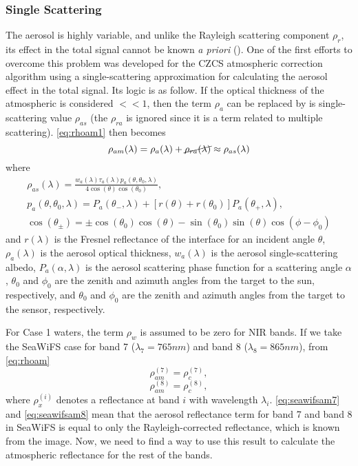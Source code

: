 \subsubsection{Single Scattering}
The aerosol is highly variable, and unlike the Rayleigh scattering component $\rho_r$, its effect in the total signal cannot be known {\it a priori} (\cite{Gordon:1994}). One of the first efforts to overcome this problem was developed for the CZCS atmospheric correction algorithm using a single-scattering approximation for calculating the aerosol effect in the total signal. Its logic is as follow. If the optical thickness of the atmospheric is considered $<<1$, then the term $\rho_a$ can be replaced by is single-scattering value $\rho_{as}$ (the $\rho_{ra}$ is ignored since it is a term related to multiple scattering). \autoref{eq:rhoam1} then becomes
\begin{equation}\label{eq:singleapprox}
  \rho_{am}(\lambda) = \rho_a(\lambda)+\cancel{\rho_{ra}(\lambda)} \approx \rho_{as}(\lambda)
\end{equation}
where
\begin{equation}
  \begin{gathered}
    \rho_{as}(\lambda) = \frac{w_a(\lambda)\tau_a(\lambda)p_a(\theta,\theta_0,\lambda)}{4\cos(\theta)\cos(\theta_0)},\\  
    p_a(\theta,\theta_0,\lambda) = P_a(\theta_{-},\lambda) + [r(\theta)+r(\theta_0)]P_a(\theta_{+},\lambda),\\
    \cos(\theta_{\pm}) = \pm \cos(\theta_0)\cos(\theta)-\sin(\theta_0)\sin(\theta)\cos(\phi-\phi_0)
  \end{gathered}
\end{equation}
and $r(\lambda)$ is the Fresnel reflectance of the interface for an incident angle $\theta$, $\rho_a(\lambda)$ is the aerosol optical thickness, $w_a(\lambda)$ is the aerosol single-scattering albedo, $P_a(\alpha,\lambda)$ is the aerosol scattering phase function for a scattering angle $\alpha$, $\theta_0$ and $\phi_0$ are the zenith and azimuth angles from the target to the sun, respectively, and $\theta_0$ and $\phi_0$ are the zenith and azimuth angles from the target to the sensor, respectively.


For Case 1 waters, the term $\rho_{w}$ is assumed to be zero for NIR bands. If we take the SeaWiFS case for band 7 ($\lambda_7=765nm$) and band 8 ($\lambda_8=865nm$), from \autoref{eq:rhoam}
\begin{equation}\label{eq:seawifsam7}
    \rho_{am}^{(7)}=\rho_{c}^{(7)},
\end{equation}
\begin{equation}\label{eq:seawifsam8}
    \rho_{am}^{(8)}=\rho_{c}^{(8)},
\end{equation}
where $\rho_{x}^{(i)}$ denotes a reflectance at band $i$ with wavelength $\lambda_i$. \autoref{eq:seawifsam7} and \autoref{eq:seawifsam8} mean that the aerosol reflectance term for band 7 and band 8 in SeaWiFS is equal to only the Rayleigh-corrected reflectance, which is known from the image. Now, we need to find a way to use this result to calculate the atmospheric reflectance for the rest of the bands.

